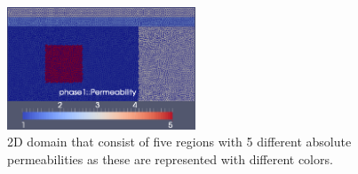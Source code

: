 \documentclass[preprint,authoryear,12pt]{elsarticle}
\begin{document}
\begin{figure}[H]
\begin{center}
\includegraphics[width=0.5\textwidth]{./Pics1/mr1_fixed/permeability.png}
\caption{2D domain that consist of five regions with 5 different absolute permeabilities as these are represented with different colors.}
\label{fig:5regions_domain}
\end{center}
\end{figure}
\end{document}
